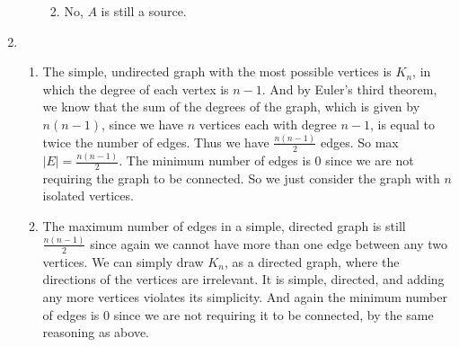 \documentclass[10pt,oneside,reqno]{amsart}
\theoremstyle{plain}
\theoremstyle{definition}
\begin{document}
\begin{enumerate}[label=\arabic*.]
\begin{enumerate}
\begin{enumerate}

\item No, $A$ is still a source. \\

\end{enumerate}






\end{enumerate}

\item 

\begin{enumerate}

\item The simple, undirected graph with the most possible vertices is $K_n$, in which the degree of each vertex is $n - 1$. And by Euler's third theorem, we know that the sum of the degrees of the graph, which is given by $n(n-1)$, since we have $n$ vertices each with degree $n -1$, is equal to twice the number of edges. Thus we have $\frac{n(n-1)}{2}$ edges. So max$|E| = \frac{n(n-1)}{2}$. The minimum number of edges is $0$ since we are not requiring the graph to be connected. So we just consider the graph with $n$ isolated vertices. \\

\item The maximum number of edges in a simple, directed graph is still $\frac{n(n-1)}{2}$ since again we cannot have more than one edge between any two vertices. We can simply draw $K_n$, as a directed graph, where the directions of the vertices are irrelevant. It is simple, directed, and adding any more vertices violates its simplicity. And again the minimum number of edges is $0$ since we are not requiring it to be connected, by the same reasoning as above. 

\end{enumerate}







\end{enumerate}
\end{document}
